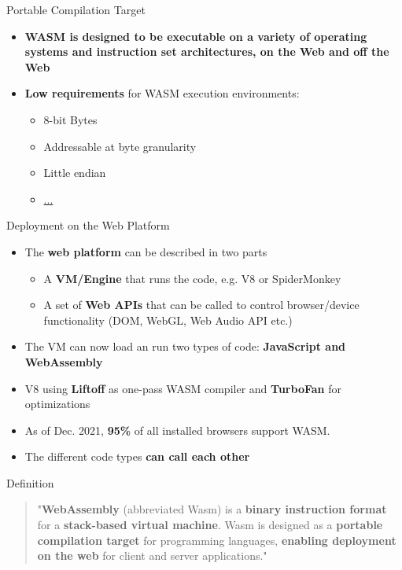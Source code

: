 \documentclass{beamer}
\begin{document}
\begin{frame}{Portable Compilation Target}
    \begin{itemize}
        \item \textbf{WASM is designed to be executable on a variety of operating systems and instruction set architectures, on the Web and off the Web}
        \item \textbf{Low requirements} for WASM execution environments:
              \begin{itemize}
                  \item 8-bit Bytes
                  \item Addressable at byte granularity
                  \item Little endian
                  \item \href{https://webassembly.org/docs/portability/}{...}
              \end{itemize}
    \end{itemize}
\end{frame}

\begin{frame}{Deployment on the Web Platform}
    \begin{itemize}
        \item The \textbf{web platform} can be described in two parts
              \begin{itemize}
                  \item A \textbf{VM/Engine} that runs the code, e.g. V8 or SpiderMonkey
                  \item A set of \textbf{Web APIs} that can be called to control browser/device functionality (DOM, WebGL, Web Audio API etc.)
              \end{itemize}
        \item The VM can now load an run two types of code: \textbf{JavaScript and WebAssembly}
        \item V8 using \textbf{Liftoff} as one-pass WASM compiler and \textbf{TurboFan} for optimizations
        \item As of Dec. 2021, \textbf{95\%} of all installed browsers support WASM.
        \item The different code types \textbf{can call each other}
    \end{itemize}
\end{frame}

\begin{frame}{Definition}
    \begin{quotation}
        "\textbf{WebAssembly} (abbreviated Wasm) is a \textbf{binary instruction format} for a \textbf{stack-based virtual machine}. Wasm is designed as a \textbf{portable compilation target} for programming languages, \textbf{enabling deployment on the web} for client and server applications."
    \end{quotation}
\end{frame}
\end{document}
